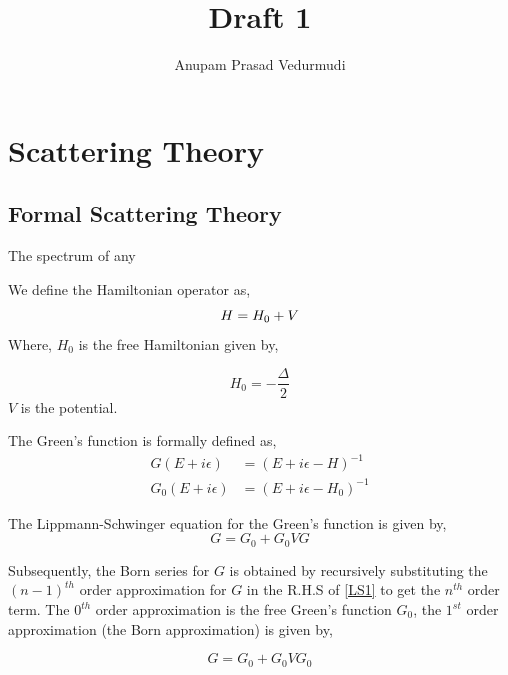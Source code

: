 \documentclass[a4paper,10pt]{report}
\title{Draft 1}
\author{Anupam Prasad Vedurmudi}
\begin{document}
\maketitle

\begin{abstract}
 
\end{abstract}

\section{Scattering Theory}

\subsection{Formal Scattering Theory}
The spectrum of any 

We define the Hamiltonian operator as,
\begin{equation}
 H = H_0+V\\
\end{equation}
\noindent Where, $H_0$ is the free Hamiltonian given by, 

\begin{equation}
 H_0=-\frac{\Delta}{2}
\end{equation}
\noindent $V$ is the potential.

\noindent The Green's function is formally defined as,
\begin{eqnarray}\label{GFdefinition}
 G\left(E+i\epsilon\right) &=\left(E+i\epsilon-H\right)^{-1}\\
 G_0\left(E+i\epsilon\right) &=\left(E+i\epsilon-H_0\right)^{-1}
\end{eqnarray}

\noindent The Lippmann-Schwinger equation for the Green's function is given by,
\begin{equation}\label{LS1}
 G=G_0+G_0VG
\end{equation}

\noindent Subsequently, the Born series for $G$ is obtained by recursively substituting
the $(n-1)^{th}$ order approximation for $G$ in the R.H.S of \eqref{LS1} to get the $n^{th}$
order term. The $0^{th}$ order approximation is the free Green's function $G_0$, the $1^{st}$
order approximation (the Born approximation) is given by,

\begin{equation}\label{BornApproximation}
 G=G_0+G_0VG_0
\end{equation}
\end{document}
